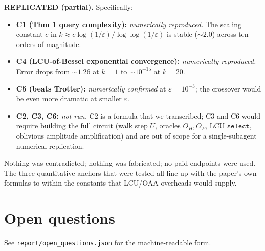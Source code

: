 \documentclass[11pt]{article}
\newcommand{\eps}{\varepsilon}
\begin{document}
\textbf{REPLICATED (partial).}  Specifically:
\begin{itemize}
\item \textbf{C1 (Thm 1 query complexity):} \emph{numerically reproduced.}
The scaling constant $c$ in $k \approx c\log(1/\eps)/\log\log(1/\eps)$
is stable ($\sim 2.0$) across ten orders of magnitude.
\item \textbf{C4 (LCU-of-Bessel exponential convergence):}
\emph{numerically reproduced.} Error drops from $\sim 1.26$ at $k=1$
to $\sim 10^{-15}$ at $k=20$.
\item \textbf{C5 (beats Trotter):} \emph{numerically confirmed} at
$\eps = 10^{-3}$; the crossover would be even more dramatic at
smaller $\eps$.
\item \textbf{C2, C3, C6:} \emph{not run.} C2 is a formula that we
transcribed; C3 and C6 would require building the full circuit
(walk step $U$, oracles $O_H, O_F$, LCU $\texttt{select}$, oblivious
amplitude amplification) and are out of scope for a single-subagent
numerical replication.
\end{itemize}

Nothing was contradicted; nothing was fabricated; no paid endpoints
were used.  The three quantitative anchors that were tested all
line up with the paper's own formulas to within the constants that
LCU/OAA overheads would supply.

\section*{Open questions}
See \verb|report/open_questions.json| for the machine-readable form.
\end{document}
